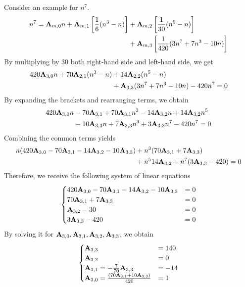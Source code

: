 Consider an example for $n^7$.
\begin{align*}
    n^7 =
    {\mathbf{A}} \sb{m,0} n
    + {\mathbf{A}} \sb{m,1} \left[ \frac{1}{6} (n^3-n) \right]
    &+ {\mathbf{A}} \sb{m,2} \left[ \frac{1}{30} (n^5-n) \right] \\
    &+ {\mathbf{A}} \sb{m,3} \left[ \frac{1}{420} (3n^7+7n^3-10n) \right]
\end{align*}
By multiplying by $30$ both right-hand side and left-hand side, we get
\begin{align*}
    420 {\mathbf{A}} \sb{3,0} n + 70 {\mathbf{A}} \sb{2,1} (n^3-n)
    &+ 14 {\mathbf{A}} \sb{2,2} (n^5-n) \\
    &+ {\mathbf{A}} \sb{3,3} (3n^7+7n^3-10n) - 420n^7 = 0
\end{align*}
By expanding the brackets and rearranging terms, we obtain
\begin{align*}
    420 {\mathbf{A}} \sb{3,0} n
    &- 70 {\mathbf{A}} \sb{3,1} + 70 {\mathbf{A}} \sb{3,1} n^3 - 14 {\mathbf{A}} \sb{3,2} n + 14 {\mathbf{A}} \sb{3,2} n^5 \\
    &- 10 {\mathbf{A}} \sb{3,3} n + 7 {\mathbf{A}} \sb{3,3} n^3 + 3 {\mathbf{A}} \sb{3,3} n^7 - 420n^7 = 0
\end{align*}
Combining the common terms yields
\begin{align*}
    n (420 {\mathbf{A}} \sb{3,0} - 70 {\mathbf{A}} \sb{3,1} - 14 {\mathbf{A}} \sb{3,2} - 10 {\mathbf{A}} \sb{3,3})
    &+ n^3 (70 {\mathbf{A}} \sb{3,1} + 7 {\mathbf{A}} \sb{3,3}) \\
    &+ n^5 14 {\mathbf{A}} \sb{3,2}
    + n^7 (3 {\mathbf{A}} \sb{3,3} - 420)
    = 0
\end{align*}
Therefore, we receive the following system of linear equations
\begin{align*}
    \begin{cases}
        420 {\mathbf{A}} \sb{3,0} - 70 {\mathbf{A}} \sb{3,1} - 14 {\mathbf{A}} \sb{3,2} - 10 {\mathbf{A}} \sb{3,3} &= 0 \\
        70 {\mathbf{A}} \sb{3,1} + 7 {\mathbf{A}} \sb{3,3} &= 0 \\
        {\mathbf{A}} \sb{3,2} - 30 &= 0 \\
        3 {\mathbf{A}} \sb{3,3} - 420 &= 0
    \end{cases}
\end{align*}
By solving it for ${\mathbf{A}} \sb{3,0}, {\mathbf{A}} \sb{3,1}, {\mathbf{A}} \sb{3,2}, {\mathbf{A}} \sb{3,3}$, we obtain
\begin{equation*}
    \begin{cases}
        {\mathbf{A}} \sb{3,3} &= 140 \\
        {\mathbf{A}} \sb{3,2} &= 0 \\
        {\mathbf{A}} \sb{3,1} = -\frac{7}{70} {\mathbf{A}} \sb{3,3} &= -14 \\
        {\mathbf{A}} \sb{3,0} = \frac{(70 {\mathbf{A}} \sb{3,1} + 10 {\mathbf{A}} \sb{3,3})}{420} &= 1
    \end{cases}
\end{equation*}
